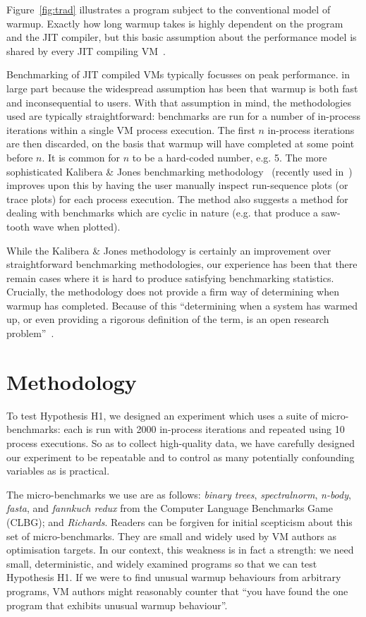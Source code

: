 \documentclass[preprint]{sigplanconf}
\newcommand{\kalibera}{Kalibera \& Jones\xspace}
\newcommand{\hypone}{H1\xspace}
\newcommand{\binarytrees}{\emph{binary trees}\xspace}
\newcommand{\richards}{\emph{Richards}\xspace}
\newcommand{\spectralnorm}{\emph{spectralnorm}\xspace}
\newcommand{\nbody}{\emph{n-body}\xspace}
\newcommand{\fasta}{\emph{fasta}\xspace}
\newcommand{\fannkuch}{\emph{fannkuch redux}\xspace}
\begin{document}
Figure~\ref{fig:trad} illustrates a
program subject to the conventional model of warmup. Exactly how long warmup
takes is highly dependent on
the program and the JIT compiler, but this basic assumption about the
performance model is shared by every JIT compiling
VM~\cite{kalibera13rigorous}.

Benchmarking of JIT compiled VMs typically focusses on peak
performance. in large part because the widespread assumption has been that
warmup is both fast and inconsequential to users. With that assumption in mind, the
methodologies used are typically straightforward: benchmarks are run for a number
of in-process iterations within a single VM process execution.
The first $n$ in-process iterations are then discarded, on the basis that warmup
will have completed at some point before $n$. It is common for
$n$ to be a hard-coded number, e.g. 5. The more sophisticated \kalibera
benchmarking methodology~\cite{kalibera12quantifying,kalibera13rigorous}
(recently used in~\cite{barrett15approaches,grimmer15dynamically}) improves
upon this by having the user manually inspect run-sequence plots (or trace
plots) for each process execution. The method also suggests a method for
dealing with benchmarks which are cyclic in nature (e.g. that produce a
saw-tooth wave when plotted).

While the \kalibera methodology is certainly an improvement over
straightforward benchmarking methodologies,
our experience has been that there remain cases where it is hard to produce
satisfying benchmarking statistics. Crucially, the methodology does not
provide a firm way of determining when warmup has completed. Because of this
``determining when a system has warmed up, or even providing a
rigorous definition of the term, is an open research problem''~\cite{seaton15phd}.

\section{Methodology}
\label{sec:methodology}

To test Hypothesis \hypone, we designed an experiment which uses a suite of
micro-benchmarks: each is run with 2000 in-process iterations and repeated
using 10 process executions. So as
to collect high-quality data, we have carefully designed our
experiment to be repeatable and to control as many potentially confounding variables as
is practical.

The micro-benchmarks we use are as follows: \binarytrees, \spectralnorm, \nbody,
\fasta, and \fannkuch from the Computer Language Benchmarks Game (CLBG); and
\richards. Readers can be forgiven for initial scepticism about this set of micro-benchmarks.
They are small and widely
used by VM authors as optimisation targets.
In our context, this weakness is in fact a strength: we need
small, deterministic, and widely examined programs so that we can test
Hypothesis \hypone. If we were to find unusual warmup behaviours from arbitrary programs,
VM authors might reasonably counter that
``you have found the one program that exhibits unusual warmup behaviour''.
\end{document}
